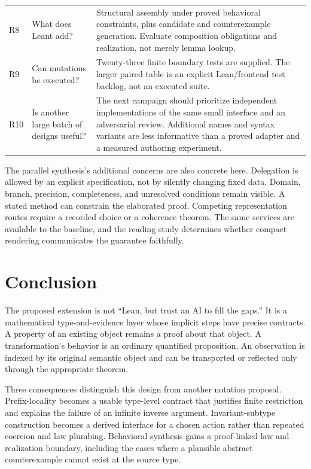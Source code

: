 \documentclass[11pt,a4paper]{article}
\theoremstyle{plain}
\theoremstyle{definition}
\begin{document}
\begin{center}
\begin{longtable}{@{}L{10mm}L{43mm}L{98mm}@{}}
R8 & What does Leant add? & Structural assembly under proved behavioral constraints, plus candidate and counterexample generation. Evaluate composition obligations and realization, not merely lemma lookup.\\
R9 & Can mutations be executed? & Twenty-three finite boundary tests are supplied. The larger paired table is an explicit Lean/frontend test backlog, not an executed suite.\\
R10 & Is another large batch of designs useful? & The next campaign should prioritize independent implementations of the same small interface and an adversarial review. Additional names and syntax variants are less informative than a proved adapter and a measured authoring experiment.\\
\bottomrule
\end{longtable}
\end{center}
The parallel synthesis's additional concerns are also concrete here. Delegation is allowed by an explicit specification, not by silently changing fixed data. Domain, branch, precision, completeness, and unresolved conditions remain visible. A stated method can constrain the elaborated proof. Competing representation routes require a recorded choice or a coherence theorem. The same services are available to the baseline, and the reading study determines whether compact rendering communicates the guarantee faithfully.

\section{Conclusion}
The proposed extension is not ``Lean, but trust an AI to fill the gaps.'' It is a mathematical type-and-evidence layer whose implicit steps have precise contracts. A property of an existing object remains a proof about that object. A transformation's behavior is an ordinary quantified proposition. An observation is indexed by its original semantic object and can be transported or reflected only through the appropriate theorem.

Three consequences distinguish this design from another notation proposal. Prefix-locality becomes a usable type-level contract that justifies finite restriction and explains the failure of an infinite inverse argument. Invariant-subtype construction becomes a derived interface for a chosen action rather than repeated coercion and law plumbing. Behavioral synthesis gains a proof-linked law and realization boundary, including the cases where a plausible abstract counterexample cannot exist at the source type.
\end{document}
